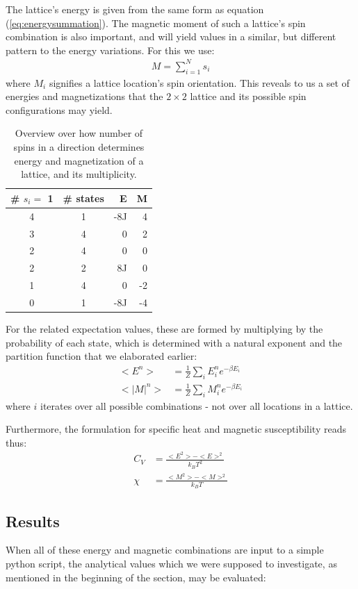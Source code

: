 \documentclass[11pt,a4paper,notitlepage,twocolumn]{article}
\begin{document}
The lattice's energy is given from the same form as equation (\ref{eq:energysummation}). The magnetic moment of such a lattice's spin combination is also important, and will yield values in a similar, but different pattern to the energy variations. For this we use:
\begin{align}\label{eq:magnetsummation}
M = \sum_{i=1}^N s_i
\end{align}
where $M_i$ signifies a lattice location's spin orientation. This reveals to us a set of energies and magnetizations that the $2\times2$ lattice and its possible spin configurations may yield.
\begin{table}[H]
\center
\begin{tabular}{|c|c|r|r|} \hline

	\# $s_i=$ 1 & \# states & E & M  \\ \hline
	4 & 1 & -8J & 4   \\
	3 & 4 & 0   & 2   \\
	2 & 4 & 0   & 0   \\
	2 & 2 & 8J  & 0   \\
	1 & 4 & 0   & -2  \\
	0 & 1 & -8J & -4  \\ \hline
\end{tabular}
\caption{Overview over how number of spins in a direction determines energy and magnetization of a lattice, and its multiplicity.}\label{table:spincombinations}
\end{table}

For the related expectation values, these are formed by multiplying by the probability of each state, which is determined with a natural exponent and the partition function that we elaborated earlier:
\begin{align}\label{eq:exvals}
<E^n> &= \frac{1}{Z}\sum_i E_i^n e^{-\beta E_i}  \\
<|M|^n> &= \frac{1}{Z}\sum_i M_i^n e^{-\beta E_i} \nonumber
\end{align}
where $i$ iterates over all possible combinations - not over all locations in a lattice.

Furthermore, the formulation for specific heat and magnetic susceptibility reads thus:
\begin{align}\label{eq:specheat_magsus}
C_V &= \frac{<E^2> - <E>^2}{k_B T^2} \\
\chi &= \frac{<M^2> - <M>^2}{k_B T} \nonumber
\end{align}

\subsection{Results}
When all of these energy and magnetic combinations are input to a simple python script, the analytical values which we were supposed to investigate, as mentioned in the beginning of the section, may be evaluated:
\end{document}
